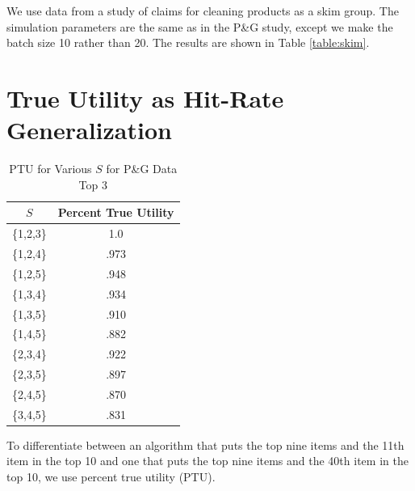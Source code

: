 \documentclass[a4paper,11pt]{article}
\begin{document}
We use data from a study of claims for cleaning products as a skim group. The simulation parameters are the same as in the P\&G study, except we make the batch size 10 rather than 20. The results are shown in Table \ref{table:skim}.

\section{True Utility as Hit-Rate Generalization}
\begin{table}
\caption{PTU for Various $S$ for P\&G Data Top 3}
\begin{center}
\begin{tabular}{c | c }
$S$& Percent True Utility \\
\hline
\{1,2,3\}& 1.0 \\
\{1,2,4\}&.973 \\
\{1,2,5\}&.948 \\
\{1,3,4\}&.934 \\
\{1,3,5\}&.910 \\
\{1,4,5\}&.882 \\
\{2,3,4\}&.922 \\
\{2,3,5\}&.897 \\
\{2,4,5\}&.870 \\
\{3,4,5\}&.831 \\
\hline
\end{tabular}
\end{center}
\label{table:PTU}
\end{table}
To differentiate between an algorithm that puts the top nine items and the 11th item in the top 10 and one that puts the top nine items and the 40th item in the top 10, we use percent true utility (PTU).
\end{document}
